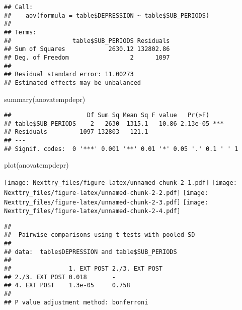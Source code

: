 \documentclass[
]{book}
\newenvironment{Shaded}{\begin{snugshade}}{\end{snugshade}}
\newcommand{\AttributeTok}[1]{\textcolor[rgb]{0.77,0.63,0.00}{#1}}
\newcommand{\ConstantTok}[1]{\textcolor[rgb]{0.00,0.00,0.00}{#1}}
\newcommand{\FunctionTok}[1]{\textcolor[rgb]{0.00,0.00,0.00}{#1}}
\newcommand{\NormalTok}[1]{#1}
\newcommand{\SpecialCharTok}[1]{\textcolor[rgb]{0.00,0.00,0.00}{#1}}
\newcommand{\StringTok}[1]{\textcolor[rgb]{0.31,0.60,0.02}{#1}}
\begin{document}
\begin{verbatim}
## Call:
##    aov(formula = table$DEPRESSION ~ table$SUB_PERIODS)
## 
## Terms:
##                 table$SUB_PERIODS Residuals
## Sum of Squares            2630.12 132802.86
## Deg. of Freedom                 2      1097
## 
## Residual standard error: 11.00273
## Estimated effects may be unbalanced
\end{verbatim}

\begin{Shaded}
\begin{Highlighting}[]
\FunctionTok{summary}\NormalTok{(anovatempdepr)}
\end{Highlighting}
\end{Shaded}

\begin{verbatim}
##                     Df Sum Sq Mean Sq F value   Pr(>F)    
## table$SUB_PERIODS    2   2630  1315.1   10.86 2.13e-05 ***
## Residuals         1097 132803   121.1                     
## ---
## Signif. codes:  0 '***' 0.001 '**' 0.01 '*' 0.05 '.' 0.1 ' ' 1
\end{verbatim}

\begin{Shaded}
\begin{Highlighting}[]
\FunctionTok{plot}\NormalTok{(anovatempdepr)}
\end{Highlighting}
\end{Shaded}

\texttt{[image: Nexttry\_files/figure-latex/unnamed-chunk-2-1.pdf]} \texttt{[image: Nexttry\_files/figure-latex/unnamed-chunk-2-2.pdf]} \texttt{[image: Nexttry\_files/figure-latex/unnamed-chunk-2-3.pdf]} \texttt{[image: Nexttry\_files/figure-latex/unnamed-chunk-2-4.pdf]}

\begin{Shaded}
\end{Shaded}

\begin{verbatim}
## 
##  Pairwise comparisons using t tests with pooled SD 
## 
## data:  table$DEPRESSION and table$SUB_PERIODS 
## 
##                1. EXT POST 2./3. EXT POST
## 2./3. EXT POST 0.018       -             
## 4. EXT POST    1.3e-05     0.758         
## 
## P value adjustment method: bonferroni
\end{verbatim}
\end{document}
